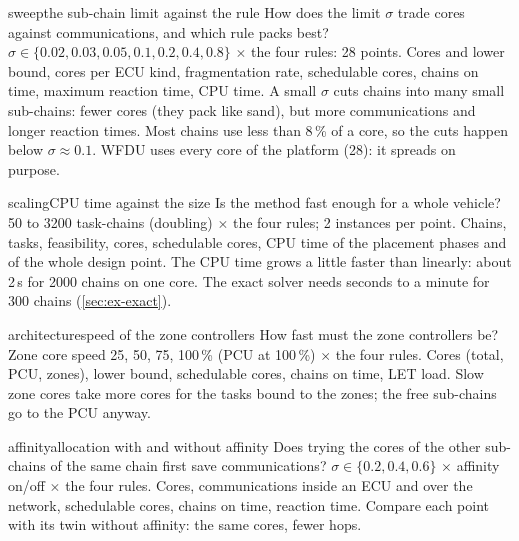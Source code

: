 \begin{experimentbox}{sweep}{the sub-chain limit against the rule}
 How does the limit $\sigma$ trade cores against
communications, and which rule packs best?
 $\sigma \in \{0.02, 0.03, 0.05, 0.1, 0.2, 0.4, 0.8\}$
$\times$ the four rules: 28 points.
 Cores and lower bound, cores per ECU kind, fragmentation
rate, schedulable cores, chains on time, maximum reaction time, CPU time.
 A small $\sigma$ cuts chains into many small sub-chains:
fewer cores (they pack like sand), but more communications and longer
reaction times. Most chains use less than 8\,\% of a core, so the cuts
happen below $\sigma \approx 0.1$. WFDU uses every core of the platform
(28): it spreads on purpose.
\end{experimentbox}

\begin{experimentbox}{scaling}{CPU time against the size}
 Is the method fast enough for a whole vehicle?
 50 to 3200 task-chains (doubling) $\times$ the four rules;
2 instances per point.
 Chains, tasks, feasibility, cores, schedulable cores,
CPU time of the placement phases and of the whole design point.
 The CPU time grows a little faster than linearly: about
2\,s for 2000 chains on one core. The exact solver needs seconds to a
minute for 300 chains (\cref{sec:ex-exact}).
\end{experimentbox}

\begin{experimentbox}{architecture}{speed of the zone controllers}
 How fast must the zone controllers be?
 Zone core speed 25, 50, 75, 100\,\% (PCU at 100\,\%)
$\times$ the four rules.
 Cores (total, PCU, zones), lower bound, schedulable
cores, chains on time, LET load.
 Slow zone cores take more cores for the tasks bound to
the zones; the free sub-chains go to the PCU anyway.
\end{experimentbox}

\begin{experimentbox}{affinity}{allocation with and without affinity}
 Does trying the cores of the other sub-chains of the
same chain first save communications?
 $\sigma \in \{0.2, 0.4, 0.6\}$ $\times$ affinity on/off
$\times$ the four rules.
 Cores, communications inside an ECU and over the
network, schedulable cores, chains on time, reaction time.
 Compare each point with its twin without affinity: the
same cores, fewer hops.
\end{experimentbox}

